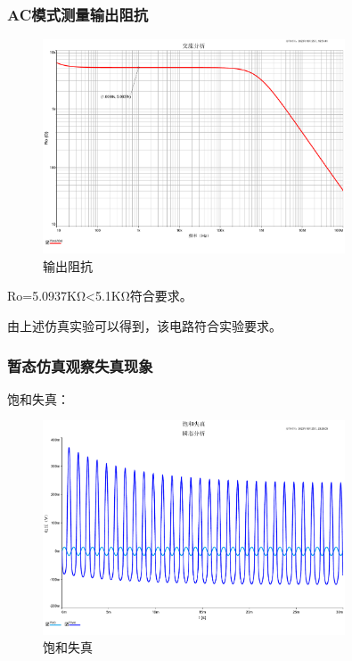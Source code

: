 \documentclass[a4paper]{article}
\theoremstyle{definition}
\theoremstyle{plain}
\theoremstyle{remark}
\begin{document}
\subsubsection{AC模式测量输出阻抗}
\begin{figure}[H]
	\centering
	\includegraphics[width=0.8\textwidth]{输出阻抗}
	\caption{输出阻抗}
	\label{输出阻抗}
\end{figure}
\vspace{-1em}
Ro=5.0937KΩ<5.1KΩ符合要求。

由上述仿真实验可以得到，该电路符合实验要求。
\vspace{-1em}
\subsubsection{暂态仿真观察失真现象}
饱和失真：
\begin{figure}[H]
	\centering
	\includegraphics[width=0.8\textwidth]{饱和失真}
	\caption{饱和失真}
	\label{饱和失真}
\end{figure}
\end{document}
